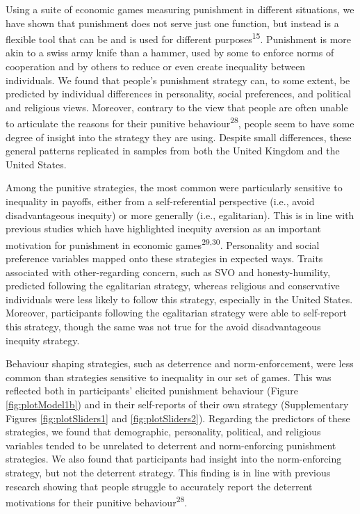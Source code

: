 \documentclass[
  man,floatsintext]{apa6}
\begin{document}
Using a suite of economic games measuring punishment in different situations,
we have shown that punishment does not serve just one function, but instead is
a flexible tool that can be and is used for different purposes\textsuperscript{15}.
Punishment is more akin to a swiss army knife than a hammer, used by some to
enforce norms of cooperation and by others to reduce or even create inequality
between individuals. We found that people's punishment strategy can, to some
extent, be predicted by individual differences in personality, social
preferences, and political and religious views. Moreover, contrary to the view
that people are often unable to articulate the reasons for their punitive
behaviour\textsuperscript{28}, people seem to have some degree of insight into the
strategy they are using. Despite small differences, these general patterns
replicated in samples from both the United Kingdom and the United States.

Among the punitive strategies, the most common were particularly sensitive to
inequality in payoffs, either from a self-referential perspective (i.e., avoid
disadvantageous inequity) or more generally (i.e., egalitarian). This is in
line with previous studies which have highlighted inequity aversion as an
important motivation for punishment in economic games\textsuperscript{29,30}. Personality and social preference variables mapped
onto these strategies in expected ways. Traits associated with other-regarding
concern, such as SVO and honesty-humility, predicted following the egalitarian
strategy, whereas religious and conservative individuals were less likely to
follow this strategy, especially in the United States. Moreover, participants
following the egalitarian strategy were able to self-report this strategy,
though the same was not true for the avoid disadvantageous inequity strategy.

Behaviour shaping strategies, such as deterrence and norm-enforcement, were less
common than strategies sensitive to inequality in our set of games. This was
reflected both in participants' elicited punishment behaviour (Figure
\ref{fig:plotModel1b}) and in their self-reports of their own strategy
(Supplementary Figures \ref{fig:plotSliders1} and \ref{fig:plotSliders2}).
Regarding the predictors of these strategies, we found that demographic,
personality, political, and religious variables tended to be unrelated to
deterrent and norm-enforcing punishment strategies. We also found that
participants had insight into the norm-enforcing strategy, but not the deterrent
strategy. This finding is in line with previous research showing that people
struggle to accurately report the deterrent motivations for their punitive
behaviour\textsuperscript{28}.
\end{document}
